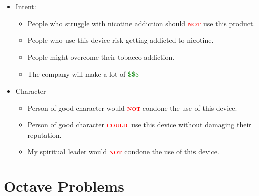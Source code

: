 \documentclass[a4paper, 10pt]{article}
\newcommand{\important}[1]{\textcolor{red}{\textbf{\textsc{#1}}}}
\begin{document}
\begin{enumerate}
\begin{enumerate}
\begin{itemize}
								\item Intent:
								\begin{itemize}
									\item People who struggle with nicotine addiction should \important{not} use this product.
									\item People who use this device risk getting addicted to nicotine.
									\item People might overcome their tobacco addiction.
									\item The company will make a lot of \textcolor{green}{\$\$\$}
								\end{itemize}
							
								\item Character
								\begin{itemize}
									\item Person of good character would \important{not} condone the use of this device.
									\item Person of good character \important{could}~use this device without damaging their reputation.
									\item My spiritual leader would \important{not} condone the use of this device.
								\end{itemize}
							\end{itemize}
						\end{enumerate}
				\end{enumerate}
	\section{Octave Problems}
\end{document}
